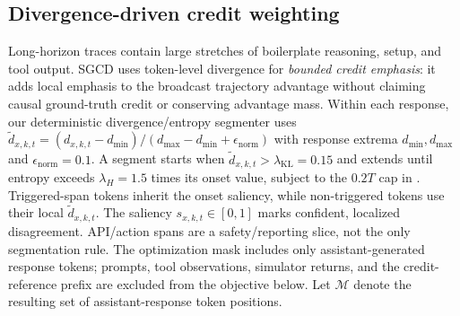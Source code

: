 \subsection{Divergence-driven credit weighting}
\label{sec:segments}
Long-horizon traces contain large stretches of boilerplate reasoning, setup, and
tool output. SGCD uses token-level divergence for \emph{bounded credit
emphasis}: it adds local emphasis to the broadcast trajectory advantage without
claiming causal ground-truth credit or conserving advantage mass. Within each
response, our deterministic divergence/entropy segmenter uses
$\tilde d_{x,k,t}=(d_{x,k,t}-d_{\min})/(d_{\max}-d_{\min}+\epsilon_{\mathrm{norm}})$
with response extrema $d_{\min},d_{\max}$ and $\epsilon_{\mathrm{norm}}=0.1$.
A segment starts when $\tilde d_{x,k,t}>\lambda_{\mathrm{KL}}=0.15$ and extends
until entropy exceeds $\lambda_H=1.5$ times its onset value, subject to the
$0.2T$ cap in . Triggered-span tokens inherit the
onset saliency, while non-triggered tokens use their local $\tilde d_{x,k,t}$.
The saliency $s_{x,k,t}\in[0,1]$ marks confident, localized disagreement.
API/action spans are a safety/reporting slice, not the only segmentation rule.
The optimization mask includes only assistant-generated response tokens;
prompts, tool observations, simulator returns, and the credit-reference prefix
are excluded from the objective below.
Let $\mathcal{M}$ denote the resulting set of assistant-response token
positions.

